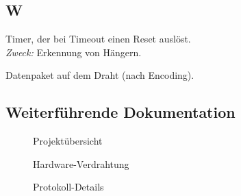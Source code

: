 \subsection*{W}

\begin{description}[style=nextline, leftmargin=2.5cm, labelwidth=2.3cm]

\item[Watchdog]
Timer, der bei Timeout einen Reset auslöst.\\
\textit{Zweck:} Erkennung von Hängern.

\item[Wire Frame]
Datenpaket auf dem Draht (nach Encoding).

\end{description}

\subsection*{Weiterführende Dokumentation}

\begin{description}
\item[] Projektübersicht
\item[] Hardware-Verdrahtung
\item[] Protokoll-Details
\end{description}
